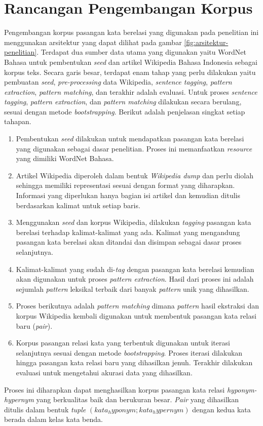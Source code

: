 \section{Rancangan Pengembangan Korpus}
Pengembangan korpus pasangan kata berelasi yang digunakan pada penelitian ini menggunakan arsitektur yang dapat dilihat pada gambar \ref{fig:arsitektur-penelitian}. Terdapat dua sumber data utama yang digunakan yaitu WordNet Bahasa untuk pembentukan \textit{seed} dan artikel Wikipedia Bahasa Indonesia sebagai korpus teks. Secara garis besar, terdapat enam tahap yang perlu dilakukan yaitu pembuatan \textit{seed}, \textit{pre-processing} data Wikipedia, \textit{sentence tagging}, \textit{pattern extraction}, \textit{pattern matching}, dan terakhir adalah evaluasi. Untuk proses \textit{sentence tagging}, \textit{pattern extraction}, dan \textit{pattern matching} dilakukan secara berulang, sesuai dengan metode \textit{bootstrapping}. Berikut adalah penjelasan singkat setiap tahapan.
\begin{enumerate}
  \item Pembentukan \textit{seed} dilakukan untuk mendapatkan pasangan kata berelasi yang digunakan sebagai dasar penelitian. Proses ini memanfaatkan \textit{resource} yang dimiliki WordNet Bahasa.
  \item Artikel Wikipedia diperoleh dalam bentuk \textit{Wikipedia dump} dan perlu diolah sehingga memiliki representasi sesuai dengan format yang diharapkan. Informasi yang diperlukan hanya bagian isi artikel dan kemudian ditulis berdasarkan kalimat untuk setiap baris.
  \item Menggunakan \textit{seed} dan korpus Wikipedia, dilakukan \textit{tagging} pasangan kata berelasi terhadap kalimat-kalimat yang ada. Kalimat yang mengandung pasangan kata berelasi akan ditandai dan disimpan sebagai dasar proses selanjutnya.
  \item Kalimat-kalimat yang sudah di-\textit{tag} dengan pasangan kata berelasi kemudian akan digunakan untuk proses \textit{pattern extraction}. Hasil dari proses ini adalah sejumlah \textit{pattern} leksikal terbaik dari banyak \textit{pattern} unik yang dihasilkan.
  \item Proses berikutnya adalah \textit{pattern matching} dimana \textit{pattern} hasil ekstraksi dan korpus Wikipedia kembali digunakan untuk membentuk pasangan kata relasi baru (\textit{pair}).
  \item Korpus pasangan relasi kata yang terbentuk digunakan untuk iterasi selanjutnya sesuai dengan metode \textit{bootstrapping}. Proses iterasi dilakukan hingga pasangan kata relasi baru yang dihasilkan jenuh. Terakhir dilakukan evaluasi untuk mengetahui akurasi data yang dihasilkan.
\end{enumerate}
Proses ini diharapkan dapat menghasilkan korpus pasangan kata relasi \textit{hyponym-hypernym} yang berkualitas baik dan berukuran besar. \textit{Pair} yang dihasilkan ditulis dalam bentuk \textit{tuple} $(kata_hyponym;kata_hypernym)$ dengan kedua kata berada dalam kelas kata benda.


